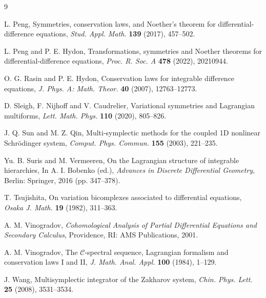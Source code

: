 \documentclass[11pt]{article} %
\numberwithin{equation}{section}
\theoremstyle{plain}
\theoremstyle{definition}
\begin{document}
\begin{thebibliography}{9}

 L. Peng, Symmetries, conservation laws, and Noether's theorem for differential-difference equations, {\it Stud. Appl. Math.} {\bf 139} (2017), 457--502.


 L. Peng and P. E. Hydon, Transformations, symmetries and Noether theorems for differential-difference equations, {\it Proc. R. Soc. A} {\bf 478} (2022), 20210944.

 O. G. Rasin and P. E. Hydon, Conservation laws for integrable difference equations, {\it J. Phys. A: Math. Theor.} {\bf 40} (2007), 12763--12773.


 D. Sleigh, F. Nijhoff and V. Caudrelier, Variational symmetries and Lagrangian multiforms, {\it Lett. Math. Phys.} {\bf 110} (2020), 805--826.

 J. Q. Sun and M. Z. Qin, Multi-symplectic methods for the coupled 1D nonlinear Schr\"{o}dinger system, {\it Comput. Phys. Commun.} {\bf 155} (2003), 221--235.

 Yu. B. Suris and M. Vermeeren, On the Lagrangian structure of integrable hierarchies, In A. I. Bobenko (ed.), {\it Advances in Discrete Differential Geometry}, Berlin: Springer, 2016 (pp. 347--378).

 T. Tsujishita, On variation bicomplexes associated to differential equations, {\it Osaka J. Math.} {\bf 19} (1982), 311--363.

 A. M. Vinogradov, {\it  Cohomological Analysis of Partial Differential Equations and Secondary Calculus}, Providence, RI: AMS Publications, 2001.

 A. M. Vinogradov, The $\mathcal{C}$-spectral sequence, Lagrangian formalism and conservation laws I and II, {\it J. Math. Anal. Appl.} {\bf 100} (1984), 1--129.

 J. Wang, Multisymplectic integrator of the Zakharov system, {\it Chin. Phys. Lett.} {\bf 25} (2008), 3531--3534.
               

\end{thebibliography}
\end{document}
